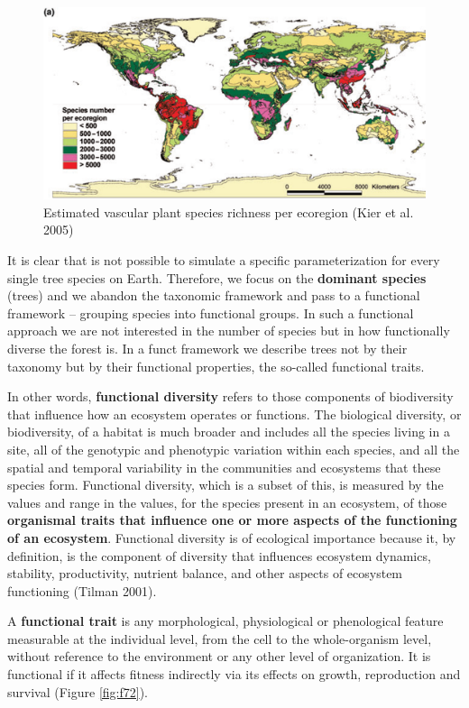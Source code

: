 \documentclass[12pt,oneside]{book}
\begin{document}
\begin{figure}

{\centering \includegraphics[width=0.8\linewidth]{figures/chap7/f71_species_map_Kier} 

}

\caption{Estimated vascular plant species richness per ecoregion (Kier et al. 2005)}\label{fig:f71}
\end{figure}

It is clear that is not possible to simulate a specific parameterization
for every single tree species on Earth. Therefore, we focus on the
\textbf{dominant species} (trees) and we abandon the taxonomic framework
and pass to a functional framework -- grouping species into functional
groups. In such a functional approach we are not interested in the
number of species but in how functionally diverse the forest is. In a
funct framework we describe trees not by their taxonomy but by their
functional properties, the so-called functional traits.

In other words, \textbf{functional diversity} refers to those components
of biodiversity that influence how an ecosystem operates or functions.
The biological diversity, or biodiversity, of a habitat is much broader
and includes all the species living in a site, all of the genotypic and
phenotypic variation within each species, and all the spatial and
temporal variability in the communities and ecosystems that these
species form. Functional diversity, which is a subset of this, is
measured by the values and range in the values, for the species present
in an ecosystem, of those \textbf{organismal traits that influence one
or more aspects of the functioning of an ecosystem}. Functional
diversity is of ecological importance because it, by definition, is the
component of diversity that influences ecosystem dynamics, stability,
productivity, nutrient balance, and other aspects of ecosystem
functioning (Tilman 2001).

A \textbf{functional trait} is any morphological, physiological or
phenological feature measurable at the individual level, from the cell
to the whole-organism level, without reference to the environment or any
other level of organization. It is functional if it affects fitness
indirectly via its effects on growth, reproduction and survival (Figure
\ref{fig:f72}).
\end{document}
